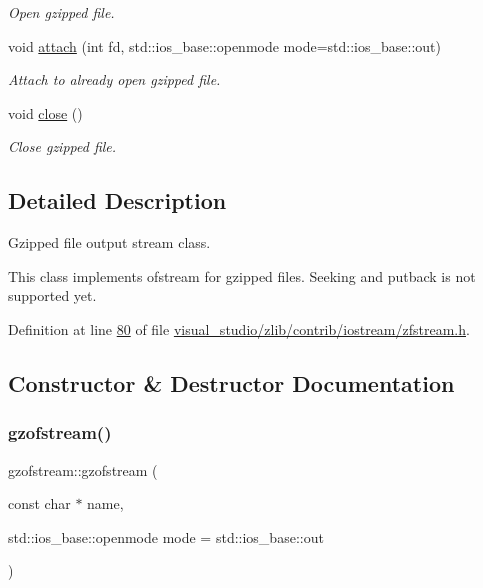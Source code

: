 \begin{DoxyCompactItemize}
\begin{DoxyCompactList}\small\item\em Open gzipped file. \end{DoxyCompactList}\item 
void \hyperlink{classgzofstream_a95b76eaecd03b6cbf53d2f4b1c867439}{attach} (int fd, std\+::ios\+\_\+base\+::openmode mode=std\+::ios\+\_\+base\+::out)
\begin{DoxyCompactList}\small\item\em Attach to already open gzipped file. \end{DoxyCompactList}\item 
void \hyperlink{classgzofstream_a59e8b01e1c9741085f18ca456c4b8f54}{close} ()
\begin{DoxyCompactList}\small\item\em Close gzipped file. \end{DoxyCompactList}\end{DoxyCompactItemize}


\subsection{Detailed Description}
Gzipped file output stream class. 

This class implements ofstream for gzipped files. Seeking and putback is not supported yet. 

Definition at line \hyperlink{visual__studio_2zlib_2contrib_2iostream_2zfstream_8h_source_l00080}{80} of file \hyperlink{visual__studio_2zlib_2contrib_2iostream_2zfstream_8h_source}{visual\+\_\+studio/zlib/contrib/iostream/zfstream.\+h}.



\subsection{Constructor \& Destructor Documentation}
\mbox{\label{classgzofstream_a4334d31aab99f8c9c2277b672a55c78f}} 
\subsubsection{\texorpdfstring{gzofstream()}{gzofstream()}\hspace{0.1cm}{\footnotesize\ttfamily [1/4]}}
{\footnotesize\ttfamily gzofstream\+::gzofstream (\begin{DoxyParamCaption}\item[{const char $\ast$}]{name,  }\item[{std\+::ios\+\_\+base\+::openmode}]{mode = {\ttfamily std\+:\+:ios\+\_\+base\+:\+:out} }\end{DoxyParamCaption})\hspace{0.3cm}{\ttfamily [explicit]}}



